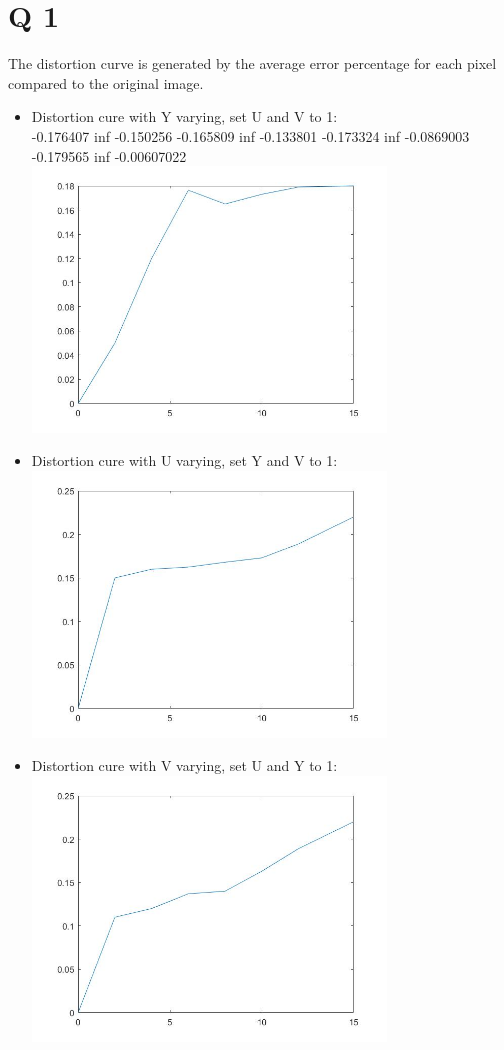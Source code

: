 \documentclass[10pt]{report}            %
\begin{document}
  \section*{Q 1}
  The distortion curve is generated by the average error percentage for each pixel compared to the original image.
  \begin{itemize}
  
  \item
  Distortion cure with Y varying, set U and V to 1:\\
  -0.176407  inf -0.150256
  -0.165809  inf -0.133801
  -0.173324  inf -0.0869003
  -0.179565  inf -0.00607022
  \includegraphics[height=200pt]{1.jpg}
  \item
  Distortion cure with U varying, set Y and V to 1:
  \includegraphics[height=200pt]{2.jpg}
  \item
  Distortion cure with V varying, set U and Y to 1:
  \includegraphics[height=200pt]{3.jpg}
\end{itemize}
\end{document}

